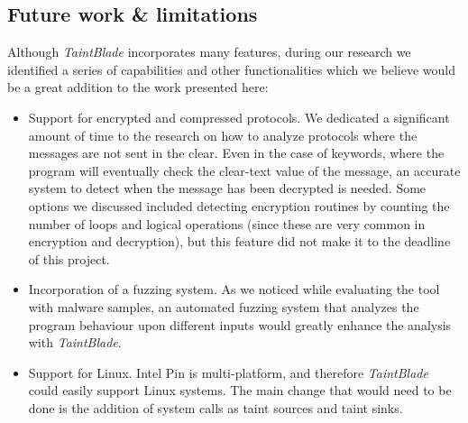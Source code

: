 \documentclass[conference]{IEEEtran}
\begin{document}
\subsection{Future work \& limitations}
Although \textit{TaintBlade} incorporates many features, during our research we identified a series 
of capabilities and other functionalities which we believe would be a great addition to the work presented
here:
\begin{itemize}
    \item Support for encrypted and compressed protocols. We dedicated a significant amount of time to the research
    on how to analyze protocols where the messages are not sent in the clear. Even in the case of keywords, where
    the program will eventually check the clear-text value of the message, an accurate system to detect when the
    message has been decrypted is needed. Some options we discussed included detecting encryption routines by
    counting the number of loops and logical operations (since these are very common in encryption and decryption),
    but this feature did not make it to the deadline of this project.
    \item Incorporation of a fuzzing system. As we noticed while evaluating the tool with malware samples,
    an automated fuzzing system that analyzes the program behaviour upon different inputs would greatly enhance the 
    analysis with \textit{TaintBlade}.
    \item Support for Linux. Intel Pin is multi-platform, and therefore \textit{TaintBlade} could
    easily support Linux systems. The main change that would need to be done is the addition of 
    system calls as taint sources and taint sinks.
\end{itemize}
\end{document}
